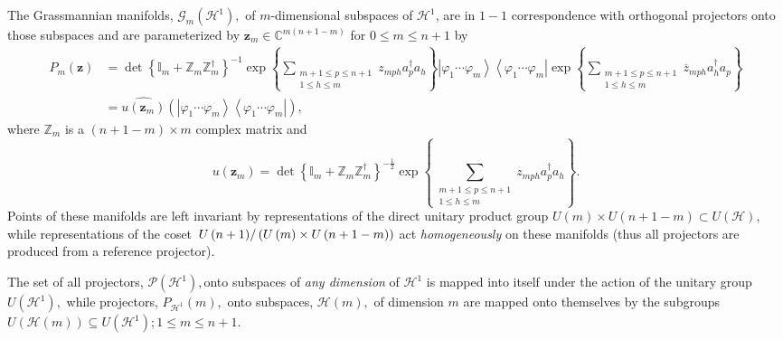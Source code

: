 \documentclass[aps,preprint]{revtex4}%
\begin{document}
The Grassmannian manifolds, $\mathcal{G}_{m}\left(  \mathcal{H}^{1}\right)  ,$
of $m$-dimensional subspaces of $\mathcal{H}^{1}$, are in $1-1$ correspondence
with orthogonal projectors onto those subspaces and are parameterized by
$\mathbf{z}_{m}\in\mathbb{C}^{m\left(  n+1-m\right)  }$ for $0\leq m\leq n+1$
by
\begin{align}
P_{m}\left(  \mathbf{z}\right)   &  =\det\left\{  \mathbb{I}_{m}%
+\mathbb{Z}_{m}\mathbb{Z}_{m}^{\dagger}\right\}  ^{-1}\exp\left\{
\sum_{\substack{m+1\leq p\leq n+1\\1\leq h\leq m}}z_{mph}a_{p}^{\dagger}%
a_{h}\right\}  \left\vert \varphi_{1}\cdots\varphi_{m}\right\rangle
\left\langle \varphi_{1}\cdots\varphi_{m}\right\vert \exp\left\{
\sum_{\substack{m+1\leq p\leq n+1\\1\leq h\leq m}}\overline{z}_{mph}%
a_{h}^{\dagger}a_{p}\right\} \\
&  =\widehat{u\left(  \mathbf{z}_{m}\right)  }\left(  \left\vert \varphi
_{1}\cdots\varphi_{m}\right\rangle \left\langle \varphi_{1}\cdots\varphi
_{m}\right\vert \right)  ,
\end{align}
where $\mathbb{Z}_{m}$ is a $\left(  n+1-m\right)  \times m$ complex matrix
and
\begin{equation}
u\left(  \mathbf{z}_{m}\right)  =\det\left\{  \mathbb{I}_{m}+\mathbb{Z}%
_{m}\mathbb{Z}_{m}^{\dagger}\right\}  ^{-\frac{1}{2}}\exp\left\{
\sum_{\substack{m+1\leq p\leq n+1\\1\leq h\leq m}}z_{mph}a_{p}^{\dagger}%
a_{h}\right\}  .
\end{equation}
Points of these manifolds are left invariant by representations of the direct
unitary product group $U\left(  m\right)  \times U\left(  n+1-m\right)
\subset U\left(  \mathcal{H}\right)  ,$while representations of the coset
$\left.  U\left(  n+1\right)  \right/  \left(  U\left(  m\right)  \times
U\left(  n+1-m\right)  \right)  $ act \emph{homogeneously} on these manifolds
(thus all projectors are produced from a reference projector).

The set of all projectors, $\mathcal{P}\left(  \mathcal{H}^{1}\right)  ,$onto
subspaces of \emph{any dimension} of $\mathcal{H}^{1}$ is mapped into itself
under the action of the unitary group $U\left(  \mathcal{H}^{1}\right)  ,$
while projectors, $P_{\mathcal{H}^{1}}\left(  m\right)  ,$ onto subspaces,
$\mathcal{H}\left(  m\right)  ,$ of dimension $m$ are mapped onto themselves
by the subgroups $U\left(  \mathcal{H}\left(  m\right)  \right)  \subseteq
U\left(  \mathcal{H}^{1}\right)  ;1\leq m\leq n+1.$
\end{document}

